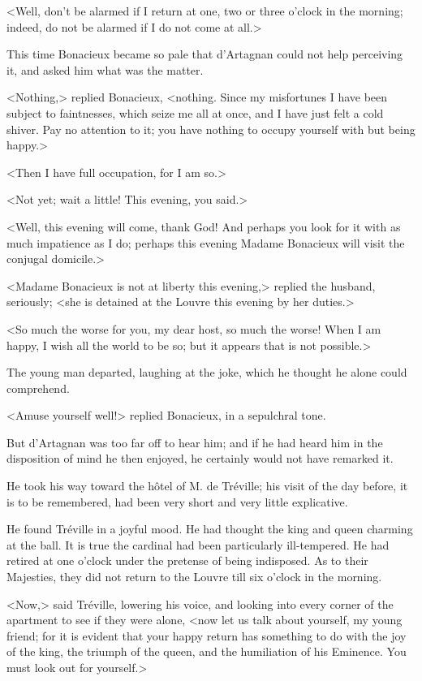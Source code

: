 <Well, don't be alarmed if I return at one, two or three o'clock in the morning; indeed, do not be alarmed if I do not come at all.> 

This time Bonacieux became so pale that d'Artagnan could not help perceiving it, and asked him what was the matter. 

<Nothing,> replied Bonacieux, <nothing. Since my misfortunes I have been subject to faintnesses, which seize me all at once, and I have just felt a cold shiver. Pay no attention to it; you have nothing to occupy yourself with but being happy.> 

<Then I have full occupation, for I am so.> 

<Not yet; wait a little! This evening, you said.> 

<Well, this evening will come, thank God! And perhaps you look for it with as much impatience as I do; perhaps this evening Madame Bonacieux will visit the conjugal domicile.> 

<Madame Bonacieux is not at liberty this evening,> replied the husband, seriously; <she is detained at the Louvre this evening by her duties.> 

<So much the worse for you, my dear host, so much the worse! When I am happy, I wish all the world to be so; but it appears that is not possible.> 

The young man departed, laughing at the joke, which he thought he alone could comprehend. 

<Amuse yourself well!> replied Bonacieux, in a sepulchral tone. 

But d'Artagnan was too far off to hear him; and if he had heard him in the disposition of mind he then enjoyed, he certainly would not have remarked it. 

He took his way toward the hôtel of M. de Tréville; his visit of the day before, it is to be remembered, had been very short and very little explicative. 

He found Tréville in a joyful mood. He had thought the king and queen charming at the ball. It is true the cardinal had been particularly ill-tempered. He had retired at one o'clock under the pretense of being indisposed. As to their Majesties, they did not return to the Louvre till six o'clock in the morning. 

<Now,> said Tréville, lowering his voice, and looking into every corner of the apartment to see if they were alone, <now let us talk about yourself, my young friend; for it is evident that your happy return has something to do with the joy of the king, the triumph of the queen, and the humiliation of his Eminence. You must look out for yourself.> 

